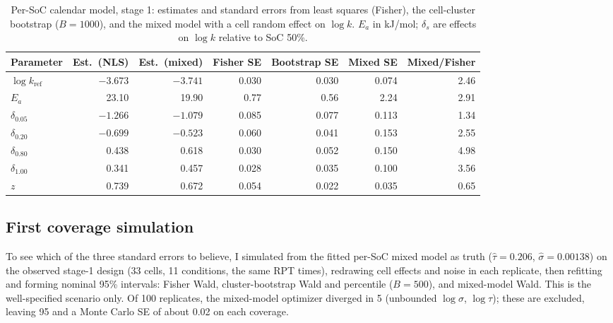 \documentclass[11pt,letterpaper]{article}
\begin{document}
\begin{table}[H]
\centering\small
\caption{Per-SoC calendar model, stage 1: estimates and standard errors from least squares (Fisher), the cell-cluster bootstrap ($B=1000$), and the mixed model with a cell random effect on $\log k$. $E_a$ in kJ/mol; $\delta_s$ are effects on $\log k$ relative to SoC 50\%.}\label{tab:calse}
\begin{tabular}{@{}lrrrrrr@{}}
\toprule
Parameter & Est.\ (NLS) & Est.\ (mixed) & Fisher SE & Bootstrap SE & Mixed SE & Mixed/Fisher \\
\midrule
$\log k_{\mathrm{ref}}$ & $-3.673$ & $-3.741$ & 0.030 & 0.030 & 0.074 & 2.46 \\
$E_a$ & 23.10 & 19.90 & 0.77 & 0.56 & 2.24 & 2.91 \\
$\delta_{0.05}$ & $-1.266$ & $-1.079$ & 0.085 & 0.077 & 0.113 & 1.34 \\
$\delta_{0.20}$ & $-0.699$ & $-0.523$ & 0.060 & 0.041 & 0.153 & 2.55 \\
$\delta_{0.80}$ & 0.438 & 0.618 & 0.030 & 0.052 & 0.150 & 4.98 \\
$\delta_{1.00}$ & 0.341 & 0.457 & 0.028 & 0.035 & 0.100 & 3.56 \\
$z$ & 0.739 & 0.672 & 0.054 & 0.022 & 0.035 & 0.65 \\
\bottomrule
\end{tabular}
\end{table}

\subsection{First coverage simulation}\label{sec:prelim-cov}
To see which of the three standard errors to believe, I simulated from the fitted per-SoC mixed model as truth ($\hat\tau=0.206$, $\hat\sigma=0.00138$) on the observed stage-1 design (33 cells, 11 conditions, the same RPT times), redrawing cell effects and noise in each replicate, then refitting and forming nominal 95\% intervals: Fisher Wald, cluster-bootstrap Wald and percentile ($B=500$), and mixed-model Wald. This is the well-specified scenario only. Of 100 replicates, the mixed-model optimizer diverged in 5 (unbounded $\log\sigma$, $\log\tau$); these are excluded, leaving 95 and a Monte Carlo SE of about 0.02 on each coverage.
\end{document}
